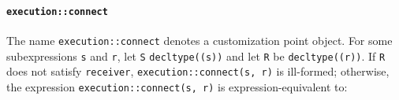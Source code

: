\documentclass[a4paper,12pt,notitlepage,twoside,openright]{article}
\begin{document}
\hypertarget{executionconnect}{%
\paragraph{\texorpdfstring{\texttt{execution::connect}}{}}\label{executionconnect}}

The name \texttt{execution::connect} denotes a customization
point object. For some subexpressions \texttt{s} and
\texttt{r}, let \texttt{S}
\texttt{decltype((s))} and let \texttt{R} be
\texttt{decltype((r))}. If \texttt{R} does not
satisfy \texttt{receiver},
\texttt{execution::connect(s, r)} is ill-formed; otherwise,
the expression \texttt{execution::connect(s, r)} is
expression-equivalent to:
\end{document}
